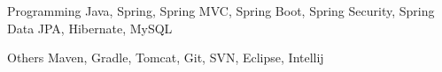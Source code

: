 
\begin{cvskills}

  \cvskill
  {Programming} %
  {Java, Spring, Spring MVC, Spring Boot, Spring Security, Spring Data JPA, Hibernate, MySQL} %

  \cvskill
    {Others} %
    {Maven, Gradle, Tomcat, Git, SVN, Eclipse, Intellij} %

\end{cvskills}
